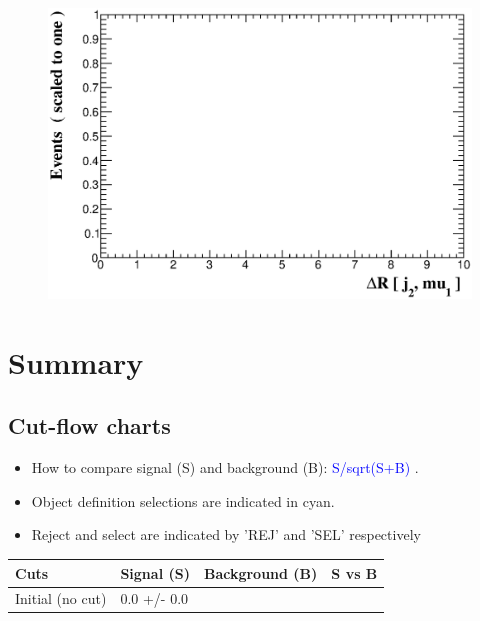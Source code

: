 \documentclass[a4paper, 10pt]{article}
\begin{document}
\begin{figure}[H]
  \begin{center}
    \includegraphics[scale=0.45]{selection_25.eps}\\
\caption{   }
  \end{center}
\end{figure}
\newpage
\section{ Summary}

\subsection{Cut-flow charts}

\begin{itemize}
  \item How to compare signal (S) and background (B): \textcolor{blue}{S/\-sqrt(S+B)} .
   \item Object definition selections are indicated in cyan.  \item Reject and select are indicated by 'REJ' and 'SEL' respectively
\end{itemize}
\begin{table}[H]
  \begin{center}
    \begin{tabular}{|m{36.0mm}|m{36.0mm}|m{36.0mm}|m{33.0mm}|}
      \hline
      {\cellcolor{yellow}        Cuts}& {\cellcolor{yellow}         Signal (S)}& {\cellcolor{yellow}         Background (B)}& {\cellcolor{yellow}         S vs B}\\
      \hline
      {\cellcolor{white}         Initial (no cut)}& {\cellcolor{white}         0.0 +/\-- 0.0}& {\cellcolor{white}         }& {\cellcolor{white}         }\\
\hline
    \end{tabular}
  \end{center}
\end{table}
\end{document}
